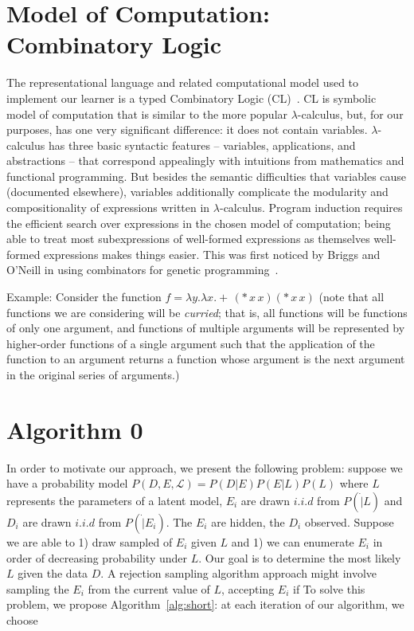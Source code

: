 \documentclass{article}
\begin{document}
\section{Model of Computation: Combinatory Logic}
The representational language and related computational model used to
implement our learner is a typed Combinatory Logic
(CL)~\cite{hindley1972introduction}. CL is symbolic model of
computation that is similar to the more popular $\lambda$-calculus,
but, for our purposes, has one very significant difference: it does
not contain variables. $\lambda$-calculus has three basic syntactic
features -- variables, applications, and abstractions -- that
correspond appealingly with intuitions from mathematics and functional
programming. But besides the semantic difficulties that variables
cause (documented elsewhere), variables additionally complicate the
modularity and compositionality of expressions written in
$\lambda$-calculus. Program induction requires the efficient search
over expressions in the chosen model of computation; being able to
treat most subexpressions of well-formed expressions as themselves
well-formed expressions makes things easier. This was first noticed by
Briggs and O'Neill in using combinators for genetic
programming~\cite{briggs2006functional}. 

Example: Consider the function $f = \lambda y. \lambda x. +\,
(*\, x\, x) (*\, x\, x)$ (note that all functions we are considering
will be \emph{curried}; that is, all functions will be functions of
only one argument, and functions of multiple arguments will be
represented by higher-order functions of a single argument such that
the application of the function to an argument returns a function
whose argument is the next argument in the original series of
arguments.)



\section{Algorithm 0}
In order to motivate our approach, we present the following problem:
suppose we have a probability model $P(D, E, \mathcal{L}) = P(D|E)
P(E|L) P(L)$ where $L$ represents the parameters of a latent model,
$E_i$ are drawn $i.i.d$ from $P(\dot | L)$ and $D_i$ are drawn $i.i.d$
from $P(\dot|E_i)$. The $E_i$ are hidden, the $D_i$ observed. Suppose
we are able to 1) draw sampled of $E_i$ given $L$ and 1) we can
enumerate $E_i$ in order of decreasing probability under $L$. Our goal
is to determine the most likely $L$ given the data $D$. A rejection
sampling algorithm approach might involve sampling the $E_i$ from the
current value of $L$, accepting $E_i$ if  To solve this problem, we propose
Algorithm~\ref{alg:short}: at each iteration of our algorithm, we
choose
\end{document}
